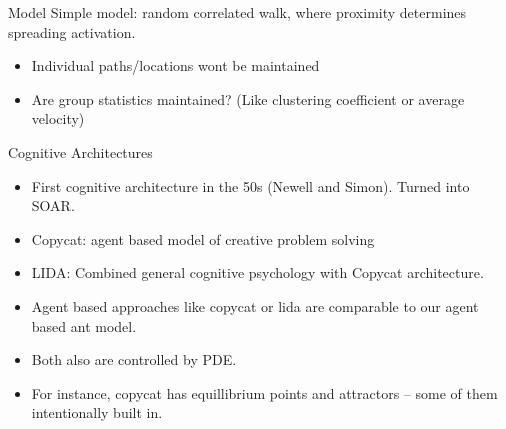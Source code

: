 \documentclass{beamer}
\begin{document}
  \begin{frame}{Model}
      Simple model: random correlated walk, where proximity determines spreading activation.
      \begin{itemize}
          \item Individual paths/locations wont be maintained
          \item Are group statistics maintained? (Like clustering coefficient or average velocity)
      \end{itemize}
  \end{frame}

  \begin{frame}{Cognitive Architectures}
      \begin{itemize}
          \item First cognitive architecture in the 50s (Newell and Simon). Turned into SOAR.
          \item Copycat: agent based model of creative problem solving
          \item LIDA: Combined general cognitive psychology with Copycat architecture.
          \item Agent based approaches like copycat or lida are comparable to our agent based ant model.
          \item Both also are controlled by PDE.
          \item For instance, copycat has equillibrium points and attractors -- some of them intentionally built in.
      \end{itemize}
  \end{frame}

\end{document}
